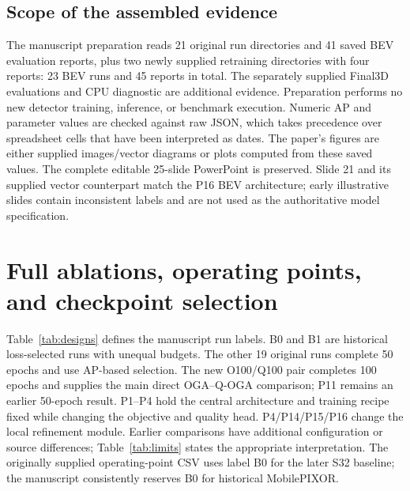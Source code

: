 \documentclass[10pt]{article}
\begin{document}
\subsection*{Scope of the assembled evidence}
The manuscript preparation reads 21 original run directories and 41 saved BEV evaluation reports, plus two newly supplied retraining directories with four reports: 23 BEV runs and 45 reports in total. The separately supplied Final3D evaluations and CPU diagnostic are additional evidence. Preparation performs no new detector training, inference, or benchmark execution. Numeric AP and parameter values are checked against raw JSON, which takes precedence over spreadsheet cells that have been interpreted as dates. The paper's figures are either supplied images/vector diagrams or plots computed from these saved values. The complete editable 25-slide PowerPoint is preserved. Slide 21 and its supplied vector counterpart match the P16 BEV architecture; early illustrative slides contain inconsistent labels and are not used as the authoritative model specification.

\section{Full ablations, operating points, and checkpoint selection}
\label{sec:ablation}
Table~\ref{tab:designs} defines the manuscript run labels. B0 and B1 are historical loss-selected runs with unequal budgets. The other 19 original runs complete 50 epochs and use AP-based selection. The new O100/Q100 pair completes 100 epochs and supplies the main direct OGA--Q-OGA comparison; P11 remains an earlier 50-epoch result. P1--P4 hold the central architecture and training recipe fixed while changing the objective and quality head. P4/P14/P15/P16 change the local refinement module. Earlier comparisons have additional configuration or source differences; Table~\ref{tab:limits} states the appropriate interpretation. The originally supplied operating-point CSV uses label B0 for the later S32 baseline; the manuscript consistently reserves B0 for historical MobilePIXOR.
\end{document}
